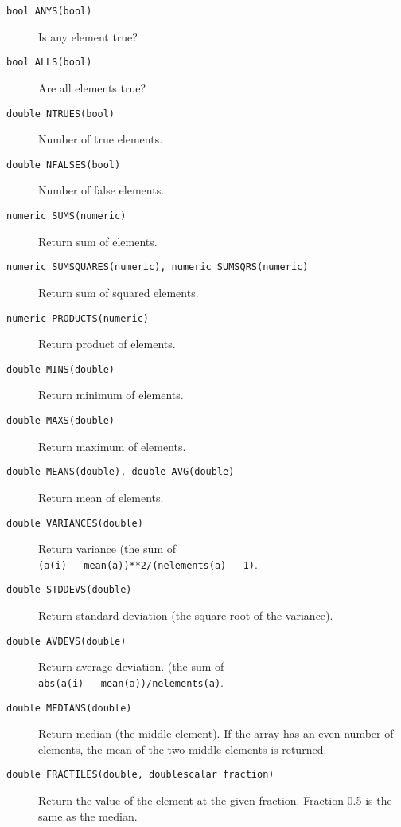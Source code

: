 \begin{description}
  \item[ \texttt{bool ANYS(bool)}] Is any element true?
  \item[ \texttt{bool ALLS(bool)}] Are all elements true?
  \item[ \texttt{double NTRUES(bool)}] Number of true elements.
  \item[ \texttt{double NFALSES(bool)}] Number of false elements.
  \item[ \texttt{numeric SUMS(numeric)}] Return sum of elements.
  \item[ \texttt{numeric SUMSQUARES(numeric), numeric SUMSQRS(numeric)}]
       Return sum of squared elements.
  \item[ \texttt{numeric PRODUCTS(numeric)}] Return product of elements.
  \item[ \texttt{double MINS(double)}] Return minimum of elements.
  \item[ \texttt{double MAXS(double)}] Return maximum of elements.
  \item[ \texttt{double MEANS(double), double AVG(double)}]
    Return mean of elements.
  \item[ \texttt{double VARIANCES(double)}] Return variance
    (the sum of
    \\\texttt{(a(i) - mean(a))**2/(nelements(a) - 1)}.
  \item[ \texttt{double STDDEVS(double)}] Return standard
    deviation (the square root of the variance).
  \item[ \texttt{double AVDEVS(double)}] Return average deviation.
    (the sum of 
    \\\texttt{abs(a(i) - mean(a))/nelements(a)}.
  \item[ \texttt{double MEDIANS(double)}] Return median (the
    middle element).
    If the array has an even number of elements, the mean of
    the two middle elements is returned.
  \item[ \texttt{double FRACTILES(double, doublescalar fraction)}]
       Return the value of the element at the given fraction.
       Fraction 0.5 is the same as the median.
\end{description}

